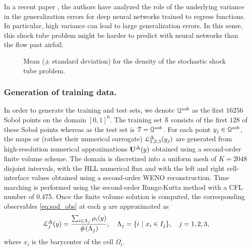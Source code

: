 \documentclass[a4paper]{article}
\numberwithin{equation}{section}
\numberwithin{equation}{section}
\theoremstyle{definition}
\theoremstyle{myremarkstyle}
\newcommand{\U}{{\bf U}}		%
\newcommand{\om}{\Omega}
\newcommand{\map}{\EuScript{L}}
\newcommand{\train}{\EuScript{S}}
\newcommand{\test}{\EuScript{T}}
\begin{document}
In a recent paper \cite{LMM1}, the authors have analyzed the role of the underlying variance in the generalization errors for deep neural networks trained to regress functions. In particular, high variance can lead to large generalization errors. In this sense, this shock tube problem might be harder to predict with neural networks than the flow past airfoil. 

\begin{figure}[htbp]
\caption{Mean ($\pm$ standard deviation) for the density of the stochastic shock tube problem.}
\label{fig:STinit}
\end{figure}

\subsubsection{Generation of training data.}
In order to generate the training and test sets, we denote $\EuScript{Q}^{sob}$ as the first $16256$ Sobol points on the domain $[0,1]^6$. The training set $\train$ consists of the first $128$ of these Sobol points whereas as the test set is $\test = \EuScript{Q}^{sob}$. For each point $y_j \in\EuScript{Q}^{sob} $, the maps or (rather their numerical surrogate) $\map_{1,2,3}^{\Delta}(y_j)$ are generated from high-resolution numerical approximations $\U^\Delta(y)$ obtained using a second-order finite volume scheme. The domain is discretized into a uniform mesh of $K=2048$ disjoint intervals, with the HLL numerical flux and with the left and right cell-interface values obtained using a second-order WENO reconstruction. Time marching is performed using the second-order Runge-Kutta method with a CFL number of 0.475.  Once the finite volume solution is computed, the corresponding observables \eqref{eq:sod_obs} at each $y$ are approximated as
\begin{equation}\label{eq:sod_obs_approx}
\map^\Delta_j(y) = \frac{\sum_{i \in \Lambda_j} \rho_i(y)}{ \#(\Lambda_j)} , \quad  \Lambda_j = \{i \ | \ x_i \in I_j\},\quad j =1,2,3,
\end{equation}
where $x_i$ is the barycenter of the cell $\om_i$.
\end{document}
